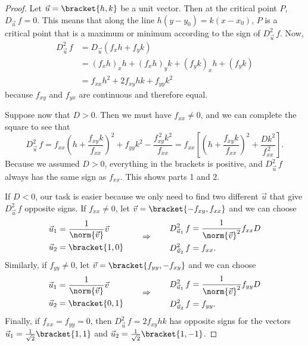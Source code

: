 \begin{proof}
Let $\vec u=\bracket{h,k}$ be a unit vector.  Then at the critical point $P$, $D_{\vec u}\,f=0$.  This means that along the line $h(y-y_0)=k(x-x_0)$, $P$ is a critical point that is a maximum or minimum according to the sign of $D_{\vec u}^2\,f$.  Now,
\begin{align*}
 D_{\vec u}^2\,f
 &=D_{\vec u}(f_xh+f_yk)\\
 &=(f_xh)_xh+(f_xh)_yk+(f_yk)_xh+(f_yk)\\
 &=f_{xx}h^2+2f_{xy}hk+f_{yy}k^2
\end{align*}
because $f_{xy}$ and $f_{yx}$ are continuous and therefore equal.

Suppose now that $D>0$.  Then we must have $f_{xx}\neq0$, and we can complete the square to see that
\[
 D_{\vec u}^2\,f
 =f_{xx}\left(h+\frac{f_{xy}k}{f_{xx}}\right)^2
 +f_{yy}k^2-\frac{f_{xy}^{\,2}k^2}{f_{xx}}
 =f_{xx}
 \left[\left(h+\frac{f_{xy}k}{f_{xx}}\right)^2+\frac{Dk^2}{f_{xx}^{\,2}}\right].
\]
Because we assumed $D>0$, everything in the brackets is positive, and $D_{\vec u}^2\,f$ always has the same sign as $f_{xx}$.  This shows parts 1 and 2.

If $D<0$, our task is easier because we only need to find two different $\vec u$ that give $D_{\vec u}^2\,f$ opposite signs.  If $f_{xx}\neq0$, let $\vec v=\bracket{-f_{xy},f_{xx}}$ and we can choose
\[
 \begin{aligned}
  \vec u_1&=\frac1{\norm{\vec v}}\vec v \\
  \vec u_2&=\bracket{1,0}
 \end{aligned}
 \qquad\Rightarrow\qquad
 \begin{aligned}
   D_{\vec u_1}^2\,f&=\frac1{\norm{\vec v}^2}f_{xx}D\\
   D_{\vec u_2}^2\,f&=f_{xx}.
  \end{aligned}
\]
Similarly, if $f_{yy}\neq0$, let $\vec v=\bracket{f_{yy},-f_{xy}}$ and we can choose
\[
 \begin{aligned}
  \vec u_1&=\frac1{\norm{\vec v}}\vec v \\
  \vec u_2&=\bracket{0,1}
 \end{aligned}
 \qquad\Rightarrow\qquad
 \begin{aligned}
   D_{\vec u_1}^2\,f&=\frac1{\norm{\vec v}^2}f_{yy}D\\
   D_{\vec u_2}^2\,f&=f_{yy}.
  \end{aligned}
\]
Finally, if $f_{xx}=f_{yy}=0$, then $D_{\vec u}^2\,f=2f_{xy}hk$ has opposite signs for the vectors $\vec u_1=\frac1{\sqrt2}\bracket{1,1}$ and $\vec u_2=\frac1{\sqrt2}\bracket{1,-1}$.
\end{proof}

